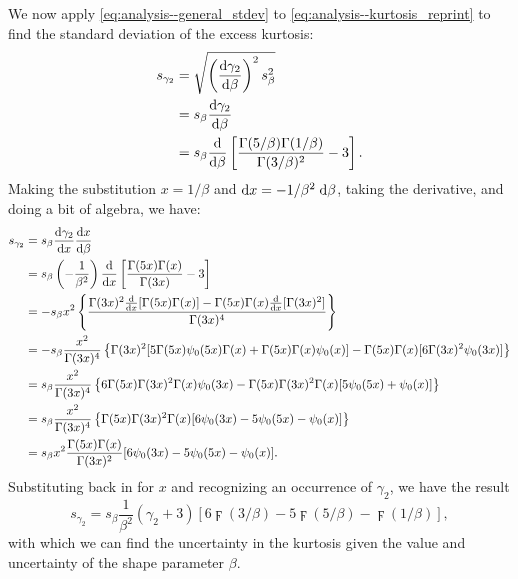 We now apply \eqref{eq:analysis--general_stdev} to \eqref{eq:analysis--kurtosis_reprint} to find the standard deviation of the excess kurtosis:
\begin{align} \label{eq:analysis--kurt_err_partial1}
	s_{\gamma_{2}} &= \sqrt{ \left( \frac{{\rm {d}} \gamma_{2}}{{\rm {d}} \beta} \right)^{2} s_{\beta}^{2} } \\
		&= s_{\beta} \frac{{\rm {d}} \gamma_{2}}{{\rm {d}} \beta} \\
		&= s_{\beta} \frac{{\rm {d}}}{{\rm {d}} \beta} \left[ \frac{\Gamma(5/\beta) \Gamma(1/\beta)}{\Gamma(3/\beta)^{2}} - 3 \right].
\end{align}
Making the substitution $x = 1 / \beta$ and ${\rm {d}} x = - 1 / \beta^{2} {\; \rm {d}} \beta$, taking the derivative, and doing a bit of algebra, we have:
\begin{align} \label{eq:analysis--kurt_err_partial2}
	s_{\gamma_{2}} &= s_{\beta} \frac{{\rm {d}} \gamma_{2}}{{\rm {d}} x} \frac{{\rm {d}} x}{{\rm {d}} \beta} \\
		&= s_{\beta} \left( -\frac{1}{\beta^{2}} \right) \frac{{\rm {d}}}{{\rm {d}} x} \left[ \frac{\Gamma(5x) \Gamma(x)}{\Gamma(3x)} - 3 \right] \\
		&= -s_{\beta} x^{2} \left\{ \frac{\Gamma(3x)^{2} \frac{{\rm {d}}}{{\rm {d}} x} [\Gamma(5x) \Gamma(x)] - \Gamma(5x) \Gamma(x) \frac{{\rm {d}}}{{\rm {d}} x} [\Gamma(3x)^{2}]}{\Gamma(3x)^{4}} \right\} \\
		&= -s_{\beta} \frac{x^{2}}{\Gamma(3x)^{4}} \left\{ \Gamma(3x)^{2} [5\Gamma(5x) {\psi_{0}}(5x) \Gamma(x) + \Gamma(5x) \Gamma(x) {\psi_{0}}(x)] - \Gamma(5x) \Gamma(x) [6\Gamma(3x)^{2} {\psi_{0}}(3x)] \right\} \\
		&= s_{\beta} \frac{x^{2}}{\Gamma(3x)^{4}} \left\{ 6\Gamma(5x) \Gamma(3x)^{2} \Gamma(x) {\psi_{0}}(3x) - \Gamma(5x) \Gamma(3x)^{2} \Gamma(x) [5{\psi_{0}}(5x) + {\psi_{0}}(x)] \right\} \\
		&= s_{\beta} \frac{x^{2}}{\Gamma(3x)^{4}} \left\{ \Gamma(5x) \Gamma(3x)^{2} \Gamma(x) [6{\psi_{0}}(3x) - 5{\psi_{0}}(5x) - {\psi_{0}}(x)] \right\} \\
		&= s_{\beta} x^{2} \frac{\Gamma(5x) \Gamma(x)}{\Gamma(3x)^{2}} [6{\psi_{0}}(3x) - 5{\psi_{0}}(5x) - {\psi_{0}}(x)].
\end{align}
Substituting back in for $x$ and recognizing an occurrence of $\gamma_{2}$, we have the result
\begin{equation} \label{eq:analysis--kurt_err}
	s_{\gamma_{2}} = s_{\beta} \frac{1}{\beta^{2}} \left( \gamma_{2} + 3 \right) \left[ 6 \digamma(3/\beta) - 5 \digamma(5/\beta) - \digamma(1/\beta) \right],
\end{equation}
with which we can find the uncertainty in the kurtosis given the value and uncertainty of the shape parameter $\beta$.

